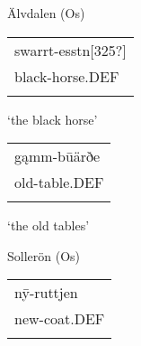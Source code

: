 \begin{listWWNumileveli}
\item {}

\begin{styleExample}
Älvdalen (Os)

\end{styleExample}

\end{listWWNumileveli}

\begin{listWWNumlxviileveli}
\item {}

\end{listWWNumlxviileveli}

\begin{tabular}{l}
\lsptoprule
swarrt-esstn[325?]\\
black-horse.DEF\\
\lspbottomrule
\end{tabular}

\begin{styleTranslation}
‘the black horse’

\end{styleTranslation}

\begin{tabular}{l}
\lsptoprule
gąmm-b\=uärðe\\
old-table.DEF\\
\lspbottomrule
\end{tabular}

\begin{styleTranslation}
‘the old tables’

\end{styleTranslation}


\begin{listWWNumileveli}
\item {}

\begin{styleExample}
Sollerön (Os)

\end{styleExample}

\end{listWWNumileveli}

\begin{tabular}{l}
\lsptoprule
n\={y}-ruttjen\\
new-coat.DEF\\
\lspbottomrule
\end{tabular}

